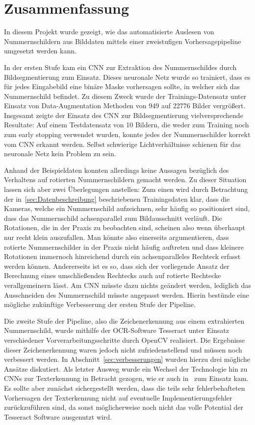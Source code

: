 \section{Zusammenfassung}
\label{sec:zusammenfassung}

In diesem Projekt wurde gezeigt, wie das automatisierte Auslesen
von Nummernschildern aus Bilddaten mittels einer zweistufigen
Vorhersagepipeline umgesetzt werden kann.

In der ersten Stufe kam ein CNN zur Extraktion des Nummernschildes durch
Bildsegmentierung zum Einsatz.
Dieses neuronale Netz wurde so trainiert, dass es f\"ur jedes
Eingabebild eine bin\"are Maske vorhersagen sollte, in welcher
sich das Nummernschild befindet.
Zu diesem Zweck wurde der Trainings-Datensatz unter
Einsatz von Data-Augmentation Methoden von 949 auf 22776 Bilder
vergr\"o{\ss}ert.
Insgesamt zeigte der Einsatz des CNN zur Bildsegmentierung vielversprechende
Resultate: Auf einem Testdatensatz von 10 Bildern, die weder zum Training
noch zum early stopping verwendet wurden, konnte jedes der Nummernschilder
korrekt vom CNN erkannt werden. Selbst schwierige Lichtverh\"altnisse schienen
f\"ur das neuronale Netz kein Problem zu sein.

Anhand der Beispieldaten konnten allerdings keine Aussagen bez\"uglich
des Verhaltens auf rotierten Nummernschildern gemacht werden.
Zu dieser Situation lassen sich aber zwei \"Uberlegungen anstellen:
Zum einen wird durch Betrachtung der in~\ref{sec:Datenbeschreibung}
beschriebenen Trainingsdaten klar, dass die Kameras, welche ein Nummernschild
aufzeichnen, sehr h\"aufig so positioniert sind, dass das Nummernschild
achsenparallel zum Bildausschnitt verl\"auft. Die Rotationen, die in der
Praxis zu beobachten sind, scheinen also wenn \"uberhaupt nur recht
klein auszufallen. Man k\"onnte also einerseits argumentieren, dass
rotierte Nummernschilder in der Praxis nicht h\"aufig auftreten und dass
kleinere Rotationen immernoch hinreichend durch ein achsenparalleles
Rechteck erfasst werden k\"onnen.
Andererseits ist es so, dass sich der vorliegende Ansatz der
Berechnung eines umschlie{\ss}enden Rechtecks auch auf rotierte
Rechtecke verallgemeinern l\"asst. Am CNN m\"usste dazu nichts ge\"andert
werden, lediglich das Ausschneiden des Nummernschild m\"usste
angepasst werden. Hierin best\"unde eine m\"ogliche zuk\"unftige
Verbesserung der ersten Stufe der Pipeline.

Die zweite Stufe der Pipeline, also die Zeichenerkennung aus einem
extrahierten Nummernschild, wurde mithilfe der OCR-Software Tesseract
unter Einsatz verschiedener Vorverarbeitungsschritte durch OpenCV realisiert.
Die Ergebnisse dieser Zeichenerkennung waren jedoch nicht
zufriedenstellend und m\"ussen noch verbessert werden.
In Abschnitt~\ref{sec:verbesserungen} wurden hierzu drei m\"ogliche
Ans\"atze diskutiert. Als letzter Ausweg wurde ein Wechsel der
Technologie hin zu CNNs zur Texterkennung in Betracht gezogen, wie er
auch in~\cite{silva2018a} zum Einsatz kam. Es sollte
aber zun\"achst sichergestellt werden, dass die teils sehr
fehlerbehafteten Vorhersagen der Texterkennung nicht auf eventuelle
Implementierungsfehler zur\"uckzuf\"uhren sind, da sonst
m\"oglicherweise noch nicht das volle Potential der Tesseract Software
ausgenutzt wird.

